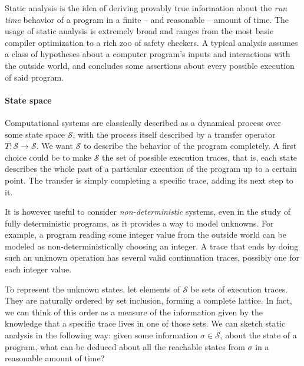 \documentclass[11pt]{article}
\renewcommand{\S}{\mathcal{S}}
\begin{document}
Static analysis is the idea of deriving provably true information about the \emph{run time} behavior of a program in a finite -- and reasonable -- amount of time.
The usage of static analysis is extremely broad and ranges from the most basic compiler optimization to a rich zoo of safety checkers.
A typical analysis assumes a class of hypotheses about a computer program's inputs and interactions with the outside world, and concludes some assertions
about every possible execution of said program.

\paragraph{State space} Computational systems are classically described as a dynamical process over some state space $\S$, with the process itself described by a transfer operator $T:\S\to\S$. We want $\S$ to describe the behavior of the program completely. A first choice could be to make $\S$ the set of possible execution traces, that is, each state describes the whole past of a particular execution of the program up to a certain point. The transfer is simply completing a specific trace, adding its next step to it.

It is however useful to consider \emph{non-deterministic} systems, even in the study of fully deterministic programs, as it provides a way to model unknowns. For example, a program reading some integer value from the outside world can be modeled as non-deterministically choosing an integer. A trace that ends by doing such an unknown operation has several valid continuation traces, possibly one for each integer value. 

To represent the unknown states, let elements of $\S$ be sets of execution traces. They are naturally ordered by set inclusion, forming a complete lattice.
In fact, we can think of this order as a measure of the information given by the knowledge that a specific trace lives in one of those sets.
We can sketch static analysis in the following way: given some information $\sigma\in\S$, about the state of a program, what can be deduced about
all the reachable states from $\sigma$ in a reasonable amount of time?
\end{document}
